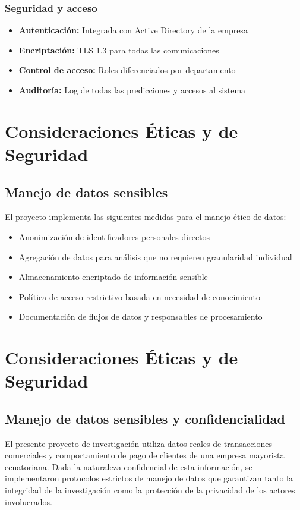 \subsubsection{Seguridad y acceso}

\begin{itemize}
    \item \textbf{Autenticación:} Integrada con Active Directory de la empresa
    \item \textbf{Encriptación:} TLS 1.3 para todas las comunicaciones
    \item \textbf{Control de acceso:} Roles diferenciados por departamento
    \item \textbf{Auditoría:} Log de todas las predicciones y accesos al sistema
\end{itemize}
\section{Consideraciones Éticas y de Seguridad}
\subsection{Manejo de datos sensibles}
El proyecto implementa las siguientes medidas para el manejo ético de datos:

\begin{itemize}
    \item Anonimización de identificadores personales directos
    \item Agregación de datos para análisis que no requieren granularidad individual
    \item Almacenamiento encriptado de información sensible
    \item Política de acceso restrictivo basada en necesidad de conocimiento
    \item Documentación de flujos de datos y responsables de procesamiento
\end{itemize}

\section{Consideraciones Éticas y de Seguridad}

\subsection{Manejo de datos sensibles y confidencialidad}
El presente proyecto de investigación utiliza datos reales de transacciones comerciales y comportamiento de pago de clientes de una empresa mayorista ecuatoriana. Dada la naturaleza confidencial de esta información, se implementaron protocolos estrictos de manejo de datos que garantizan tanto la integridad de la investigación como la protección de la privacidad de los actores involucrados.

